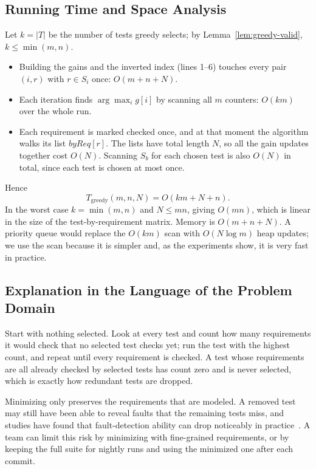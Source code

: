 \documentclass[conference]{IEEEtran}
\theoremstyle{definition}
\theoremstyle{remark}
\begin{document}
\subsection{Running Time and Space Analysis}
Let $k = |T|$ be the number of tests greedy selects; by
Lemma~\ref{lem:greedy-valid}, $k \le \min(m,n)$.
\begin{itemize}
  \item Building the gains and the inverted index (lines 1--6) touches every
        pair $(i, r)$ with $r \in S_i$ once: $O(m + n + N)$.
  \item Each iteration finds $\arg\max_i g[i]$ by scanning all $m$ counters:
        $O(km)$ over the whole run.
  \item Each requirement is marked checked once, and at that moment the
        algorithm walks its list $\mathit{byReq}[r]$. The lists have total
        length $N$, so all the gain updates together cost $O(N)$. Scanning
        $S_b$ for each chosen test is also $O(N)$ in total, since each test is
        chosen at most once.
\end{itemize}
Hence
\[
T_{\text{greedy}}(m,n,N) = O(km + N + n).
\]
In the worst case $k = \min(m,n)$ and $N \le mn$, giving $O(mn)$, which is
linear in the size of the test-by-requirement matrix. Memory is $O(m + n + N)$.
A priority queue would replace the $O(km)$ scan with $O(N \log m)$ heap
updates; we use the scan because it is simpler and, as the experiments show, it
is very fast in practice.

\subsection{Explanation in the Language of the Problem Domain}
\label{sec:p2-domain}
Start with nothing selected. Look at every test and count how many
requirements it would check that no selected test checks yet; run the test
with the highest count, and repeat until every requirement is checked. A test
whose requirements are all already checked by selected tests has count zero
and is never selected, which is exactly how redundant tests are dropped.

Minimizing only preserves the requirements that are modeled. A removed test
may still have been able to reveal faults that the remaining tests miss, and
studies have found that fault-detection ability can drop noticeably in
practice~\cite{rothermel1998}. A team can limit this risk by
minimizing with fine-grained requirements, or by keeping the full suite for
nightly runs and using the minimized one after each commit.
\end{document}
